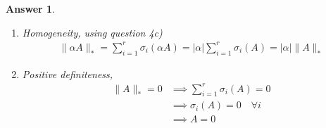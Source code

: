 \documentclass[12pt]{article}
\theoremstyle{colon}
\newtheorem*{answer}{Answer}
\begin{document}
\begin{answer}
\begin{enumerate}[label=\alph*)]
\begin{enumerate}[label=\roman*)]
        \item Homogeneity, using question 4c)
          \begin{gather*}
            \lVert \alpha A \rVert_* = \sum_{i=1}^r \sigma_i(\alpha A) = \lvert \alpha \rvert \sum_{i=1}^r \sigma_i(A) = \lvert \alpha \rvert \lVert A \rVert_*
          \end{gather*}

        \item Positive definiteness,
          \begin{align*}
            \lVert A \rVert_* = 0 &\implies \sum_{i=1}^r \sigma_i(A) = 0 \\
            &\implies \sigma_i(A) = 0 \quad \forall i \\
            &\implies A = 0
          \end{align*}
      \end{enumerate}
  \end{enumerate}
\end{answer}
\end{document}
